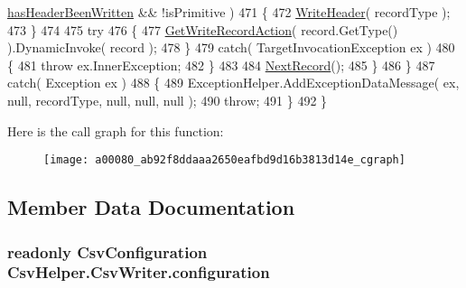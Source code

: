 \begin{DoxyCode}
      \hyperlink{a00080_a48b53b7f4428286805b1eaac1055b2bf}{hasHeaderBeenWritten} && !isPrimitive )
471                     \{
472                         \hyperlink{a00080_af2298dcd2934550fd9dd592921f18541}{WriteHeader}( recordType );
473                     \}
474 
475                     \textcolor{keywordflow}{try}
476                     \{
477                         \hyperlink{a00080_a1ab2b602b050ceb6f0a0874504ddf3f3}{GetWriteRecordAction}( record.GetType() ).DynamicInvoke( record 
      );
478                     \}
479                     \textcolor{keywordflow}{catch}( TargetInvocationException ex )
480                     \{
481                         \textcolor{keywordflow}{throw} ex.InnerException;
482                     \}
483 
484                     \hyperlink{a00080_a397af8c87002d3b9c2b5152c6981d4d2}{NextRecord}();
485                 \}
486             \}
487             \textcolor{keywordflow}{catch}( Exception ex )
488             \{
489                 ExceptionHelper.AddExceptionDataMessage( ex, null, recordType, null, null, null );
490                 \textcolor{keywordflow}{throw};
491             \}
492         \}
\end{DoxyCode}


Here is the call graph for this function\-:
\nopagebreak
\begin{figure}[H]
\begin{center}
\leavevmode
\texttt{[image: a00080\_ab92f8ddaaa2650eafbd9d16b3813d14e\_cgraph]}
\end{center}
\end{figure}




\subsection{Member Data Documentation}
\hypertarget{a00080_a0711748c9a399cfbcbad93857304fc67}{
\subsubsection[{configuration}]{\setlength{\rightskip}{0pt plus 5cm}readonly {\bf Csv\-Configuration} Csv\-Helper.\-Csv\-Writer.\-configuration\hspace{0.3cm}{\ttfamily [private]}}}\label{a00080_a0711748c9a399cfbcbad93857304fc67}


